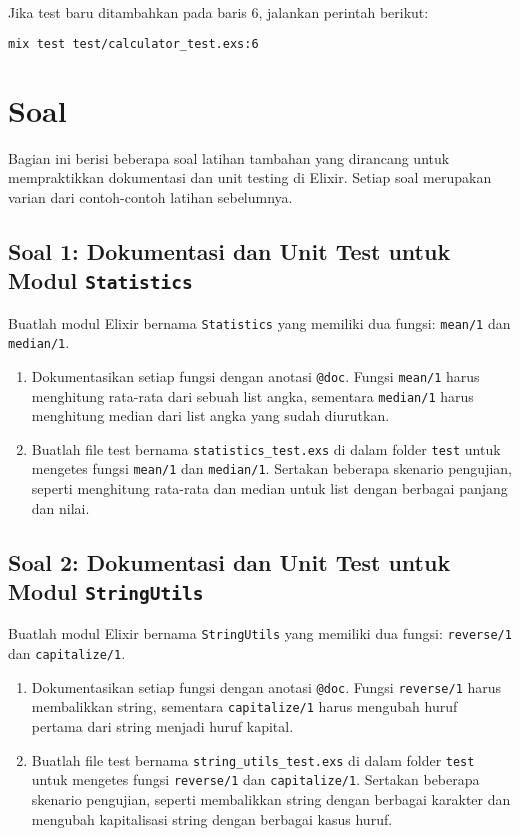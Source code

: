 Jika test baru ditambahkan pada baris 6, jalankan perintah berikut:

\begin{lstlisting}[language=Bash]
	mix test test/calculator_test.exs:6
\end{lstlisting}


\section{Soal}

Bagian ini berisi beberapa soal latihan tambahan yang dirancang untuk mempraktikkan dokumentasi dan unit testing di Elixir. Setiap soal merupakan varian dari contoh-contoh latihan sebelumnya.

\subsection{Soal 1: Dokumentasi dan Unit Test untuk Modul \texttt{Statistics}}

Buatlah modul Elixir bernama \texttt{Statistics} yang memiliki dua fungsi: \texttt{mean/1} dan \texttt{median/1}. 

\begin{enumerate}
	\item Dokumentasikan setiap fungsi dengan anotasi \texttt{@doc}. Fungsi \texttt{mean/1} harus menghitung rata-rata dari sebuah list angka, sementara \texttt{median/1} harus menghitung median dari list angka yang sudah diurutkan.
	\item Buatlah file test bernama \texttt{statistics\_test.exs} di dalam folder \texttt{test} untuk mengetes fungsi \texttt{mean/1} dan \texttt{median/1}. Sertakan beberapa skenario pengujian, seperti menghitung rata-rata dan median untuk list dengan berbagai panjang dan nilai.
\end{enumerate}

\subsection{Soal 2: Dokumentasi dan Unit Test untuk Modul \texttt{StringUtils}}

Buatlah modul Elixir bernama \texttt{StringUtils} yang memiliki dua fungsi: \texttt{reverse/1} dan \texttt{capitalize/1}. 

\begin{enumerate}
	\item Dokumentasikan setiap fungsi dengan anotasi \texttt{@doc}. Fungsi \texttt{reverse/1} harus membalikkan string, sementara \texttt{capitalize/1} harus mengubah huruf pertama dari string menjadi huruf kapital.
	\item Buatlah file test bernama \texttt{string\_utils\_test.exs} di dalam folder \texttt{test} untuk mengetes fungsi \texttt{reverse/1} dan \texttt{capitalize/1}. Sertakan beberapa skenario pengujian, seperti membalikkan string dengan berbagai karakter dan mengubah kapitalisasi string dengan berbagai kasus huruf.
\end{enumerate}


